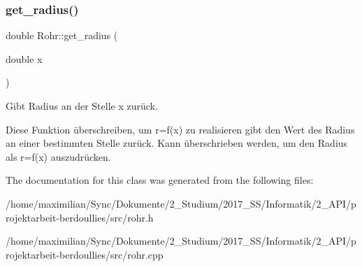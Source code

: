 \subsubsection{\texorpdfstring{get\+\_\+radius()}{get\_radius()}}
{\footnotesize\ttfamily double Rohr\+::get\+\_\+radius (\begin{DoxyParamCaption}\item[{double}]{x }\end{DoxyParamCaption})}



Gibt Radius an der Stelle x zurück. 

Diese Funktion überschreiben, um r=f(x) zu realisieren gibt den Wert des Radius an einer bestimmten Stelle zurück. Kann überschrieben werden, um den Radius als r=f(x) auszudrücken.

The documentation for this class was generated from the following files\+:\begin{DoxyCompactItemize}
\item 
/home/maximilian/\+Sync/\+Dokumente/2\+\_\+\+Studium/2017\+\_\+\+S\+S/\+Informatik/2\+\_\+\+A\+P\+I/projektarbeit-\/berdoullies/src/rohr.\+h\item 
/home/maximilian/\+Sync/\+Dokumente/2\+\_\+\+Studium/2017\+\_\+\+S\+S/\+Informatik/2\+\_\+\+A\+P\+I/projektarbeit-\/berdoullies/src/rohr.\+cpp\end{DoxyCompactItemize}
